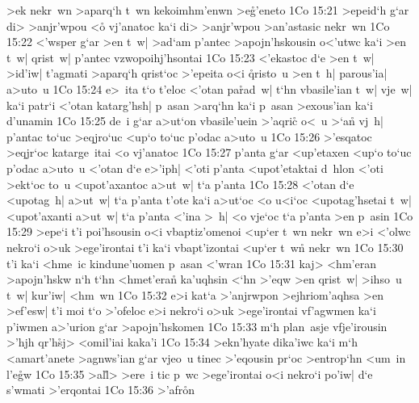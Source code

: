 >ek
nekr~wn
>aparq`h
t~wn
kekoimhm'enwn
>e\r{g}'eneto\bibvsend
{}
\vs 1Co 15:21
>epeid`h
g`ar
di>
>anjr'wpou
<o\r{}
vj'anatoc
ka`i
di>
>anjr'wpou
>an'astasic
nekr~wn\bibvsend
\vs 1Co 15:22
<'wsper
g`ar
>en
t~w|
>ad`am
p'antec
>apojn'hskousin
o<'utwc
ka`i
>en
t~w|
qrist~w|
p'antec
vzwopoihj'hsontai\bibvsend
\vs 1Co 15:23
<'ekastoc
d`e
>en
t~w|
>id'iw|
t'agmati
>aparq`h
qrist`oc
>'epeita
o<i
\r{q}risto~u
>en
t~h|
parous'ia|
a>uto~u\bibvsend
\vs 1Co 15:24
e>~ita
t`o
t'eloc
<'otan
pa\r{r}ad~w|
t`hn
vbasile'ian
t~w|
vje~w|
ka`i
patr`i
<'otan
katarg'hsh|
p~asan
>arq`hn
ka`i
p~asan
>exous'ian
ka`i
d'unamin\bibvsend
\vs 1Co 15:25
de~i
g`ar
a>ut`on
vbasile'uein
>'aqri\r{c}
o<~u
>`a\r{n}
vj~h|
p'antac
to`uc
>eqjro`uc
<up`o
to`uc
p'odac
a>uto~u\bibvsend
\vs 1Co 15:26
>'esqatoc
>eqjr`oc
katarge~itai
<o
vj'anatoc\bibvsend
\vs 1Co 15:27
p'anta
g`ar
<up'etaxen
<up`o
to`uc
p'odac
a>uto~u
<'otan
d`e
e>'iph|
<'oti
p'anta
<upot'etaktai
d~hlon
<'oti
>ekt`oc
to~u
<upot'axantoc
a>ut~w|
t`a
p'anta\bibvsend
\vs 1Co 15:28
<'otan
d`e
<upotag~h|
a>ut~w|
t`a
p'anta
t'ote
ka`i
a>ut`oc
<o
u<i`oc
<upotag'hsetai
t~w|
<upot'axanti
a>ut~w|
t`a
p'anta
<'ina
>~h|
<o
vje`oc
t`a
p'anta
>en
p~asin\bibvsend
\vs 1Co 15:29
>epe`i
t'i
poi'hsousin
o<i
vbaptiz'omenoi
<up`er
t~wn
nekr~wn
e>i
<'olwc
nekro`i
o>uk
>ege'irontai
t'i
ka`i
vbapt'izontai
<up`er
t~wn\r{}
nekr~wn\bibvsend
\vs 1Co 15:30
t'i
ka`i
<hme~ic
kindune'uomen
p~asan
<'wran\bibvsend
\vs 1Co 15:31
kaj>
<hm'eran
>apojn'hskw
n`h
t`hn
<hmet'eran\r{}
ka'uqhsin
<`hn
>'eqw
>en
qrist~w|
>ihso~u
t~w|
kur'iw|
<hm~wn\bibvsend
\vs 1Co 15:32
e>i
kat`a
>'anjrwpon
>ejhriom'aqhsa
>en
>ef'esw|
t'i
moi
t`o
>'ofeloc
e>i
nekro`i
o>uk
>ege'irontai
vf'agwmen
ka`i
p'iwmen
a>'urion
g`ar
>apojn'hskomen\bibvsend
\vs 1Co 15:33
m`h
plan~asje
vfje'irousin
>'hjh
qr'h\r{s}j>
<omil'iai
kaka'i\bibvsend
\vs 1Co 15:34
>ekn'hyate
dika'iwc
ka`i
m`h
<amart'anete
>agnws'ian
g`ar
vjeo~u
tinec
>'eqousin
pr`oc
>entrop`hn
<um~in
l'e\r{g}w\bibvsend
{}
\vs 1Co 15:35
>al\r{l}>
>ere~i
tic
p~wc
>ege'irontai
o<i
nekro`i
po'iw|
d`e
s'wmati
>'erqontai\bibvsend
\vs 1Co 15:36
>'afr\r{o}n
